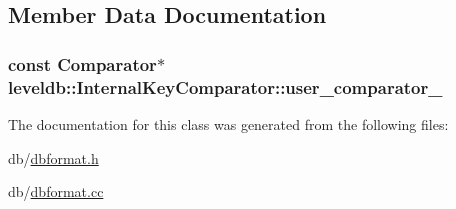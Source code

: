 \subsection{Member Data Documentation}
\hypertarget{classleveldb_1_1_internal_key_comparator_a1011c83522345c023e740c9fc900d536}{}
\subsubsection[{user\+\_\+comparator\+\_\+}]{\setlength{\rightskip}{0pt plus 5cm}const {\bf Comparator}$\ast$ leveldb\+::\+Internal\+Key\+Comparator\+::user\+\_\+comparator\+\_\+\hspace{0.3cm}{\ttfamily [private]}}\label{classleveldb_1_1_internal_key_comparator_a1011c83522345c023e740c9fc900d536}


The documentation for this class was generated from the following files\+:\begin{DoxyCompactItemize}
\item 
db/\hyperlink{dbformat_8h}{dbformat.\+h}\item 
db/\hyperlink{dbformat_8cc}{dbformat.\+cc}\end{DoxyCompactItemize}
